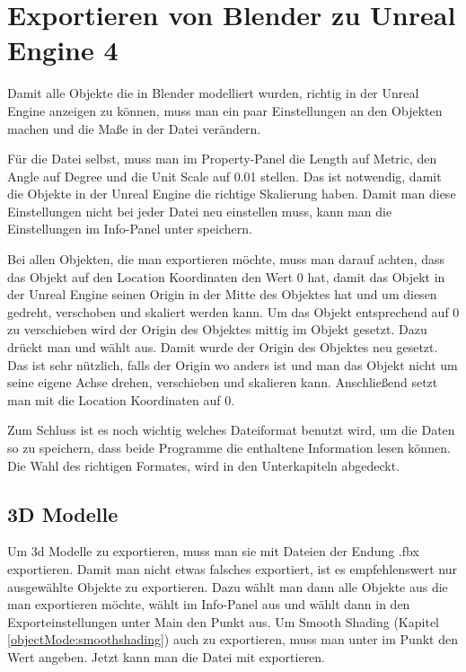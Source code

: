 \section{Exportieren von Blender zu Unreal Engine 4}
\label{Exportieren_von_Blender_zu_Unreal_Engine_4:ref1}
Damit alle Objekte die in Blender modelliert wurden, richtig in der Unreal Engine anzeigen zu können, muss man ein paar
Einstellungen an den Objekten machen und die Maße in der Datei verändern.

Für die Datei selbst, muss man im Property-Panel die Length auf Metric, den Angle auf Degree und die Unit Scale auf 0.01 stellen.
Das ist notwendig, damit die Objekte in der Unreal Engine die richtige Skalierung haben. Damit man diese Einstellungen nicht bei
jeder Datei neu einstellen muss, kann man die Einstellungen im Info-Panel unter  speichern.

Bei allen Objekten, die man exportieren möchte, muss man darauf achten, dass das Objekt auf den Location Koordinaten
den Wert 0 hat, damit das Objekt in der Unreal Engine seinen Origin in der Mitte des Objektes hat und um diesen gedreht, verschoben und skaliert werden kann.
Um das Objekt entsprechend auf 0 zu verschieben wird der Origin des Objektes mittig im Objekt gesetzt. Dazu drückt man  und
wählt  aus. Damit wurde der Origin des Objektes neu gesetzt. Das ist sehr nützlich, falls der Origin wo anders ist und man das
Objekt nicht um seine eigene Achse drehen, verschieben und skalieren kann. Anschließend setzt man mit  die Location Koordinaten auf 0.

Zum Schluss ist es noch wichtig welches Dateiformat benutzt wird, um die Daten so zu speichern, dass beide Programme die enthaltene
Information lesen können. Die Wahl des richtigen Formates, wird in den Unterkapiteln abgedeckt.

\subsection{3D Modelle}
Um 3d Modelle zu exportieren, muss man sie mit Dateien der Endung .fbx exportieren. Damit man nicht etwas falsches exportiert, ist es empfehlenswert
nur ausgewählte Objekte zu exportieren. Dazu wählt man dann alle Objekte aus die man exportieren möchte, wählt im Info-Panel  aus und wählt dann in den Exporteinstellungen unter Main den Punkt  aus. Um Smooth Shading (Kapitel \ref{objectMode:smoothshading})
auch zu exportieren, muss man unter  im Punkt  den Wert  angeben. Jetzt kann man die Datei mit  exportieren.

